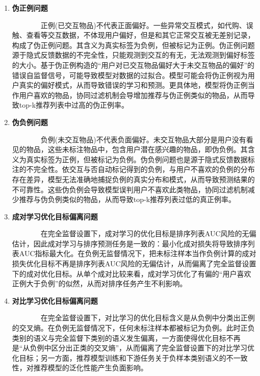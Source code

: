 \begin{enumerate}
\item \textbf{伪正例问题}

~~~~~~~~正例(已交互物品)不代表正面偏好。一些异常交互模式，如代购、误触、查看等交互数据，不体现用户偏好，但是和其它正常交互被无差别记录，构成了伪正例问题。其含义为真实标签为负例，但被标记为正例\cite{ml:2018}。伪正例问题源于隐式反馈数据的不完全性，只能观测到交互的有无，无法观测到偏好标签的大小。基于伪正例构造的“用户对已交互物品偏好大于未交互物品的偏好”的错误自监督信号，可能导致模型对数据的过拟合。模型可能会将伪正例视为用户真实的偏好模式，从而导致错误的学习和预测\cite{Han:2018:NIPS,Arpit:2017:ICML}。更具体地，模型将伪正例当作用户喜欢的物品，协同过滤机制会导增加推荐与伪正例类似的物品，从而导致top-k推荐列表中过高的伪正例率。

\item \textbf{伪负例问题}

~~~~~~~~负例(未交互物品)不代表负面偏好。未交互物品大部分是用户没有看见的物品，这些未标注物品中，包含用户潜在感兴趣的物品，即伪负例。其含义为真实标签为正例，但被标记为负例\cite{ml:2018}。伪负例问题也是源于隐式反馈数据标注的不完全性。依交互与否自动标记得到的负例，与用户不喜欢的负例的分布存在差异，模型无法准确地捕捉负例的真实分布和模式\cite{gutmann:2012:JMLR}，从而导致预测结果的不可靠性。这些伪负例会导致模型误判用户不喜欢此类物品，协同过滤机制减少推荐与伪负例类似的物品，从而导致top-k推荐列表过低的真正例率。

\item \textbf{成对学习优化目标偏离问题}

~~~~~~~~在完全监督设置下，成对学习的优化目标是排序列表AUC风险的无偏估计，因此成对学习与排序预测任务是一致的：最小化成对损失将导致排序列表AUC指标最大化\cite{Steffen:2009:UAI}。在负例无监督情况下，把未标注样本当作负例计算的成对损失优化目标不再是排序列表AUC风险的无偏估计，从而偏离了完全监督设置下的成对优化目标。从单个成对比较来看，成对学习优化了有偏的“用户喜欢正例大于负例”的似然，从而对排序任务产生不利影响。

\item \textbf{对比学习优化目标偏离问题}

~~~~~~~~在完全监督设置下，对比学习的优化目标含义是从负例中分类出正例的交叉熵。在负例无监督情况下，任何未标注样本都被标记为负例。此时正负类别的语义与完全监督下类别的语义发生偏离，一方面使得优化目标不再是“从负例中区分出正类的交叉熵”，从而偏离了完全监督设置下的对比学习优化目标\cite{Chuang:2020:NIPS,Li:2021:ICLR}；另一方面，推荐模型训练和下游任务关于负样本类别语义的不一致性，对推荐模型的泛化性能产生负面影响。
\end{enumerate}



